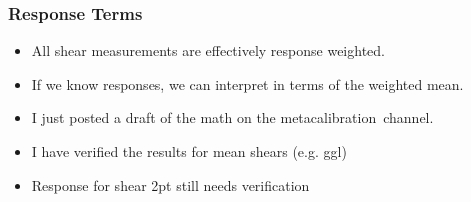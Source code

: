 \documentclass{beamer}
\newcommand{\mcal}{metacalibration}
\begin{document}
\frame
{
    \frametitle{Response Terms}

    \begin{itemize}

        \item All shear measurements are effectively response weighted.

        \item If we know responses, we can interpret in terms of the
            weighted mean.

        \item I just posted a draft of the math on the \mcal\ channel.

        \item I have verified the results for mean shears (e.g. ggl)

        \item Response for shear 2pt still needs verification


    \end{itemize}
}
\end{document}
